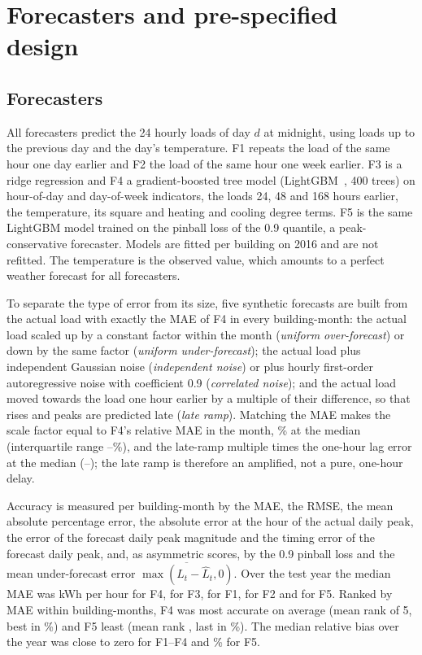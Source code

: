 \section{Forecasters and pre-specified design}\label{sec:design}

\subsection{Forecasters}
All forecasters predict the 24 hourly loads of day $d$ at midnight, using loads up to the previous day and the day's temperature. F1 repeats the load of the same hour one day earlier and F2 the load of the same hour one week earlier. F3 is a ridge regression and F4 a gradient-boosted tree model (LightGBM~\cite{ke2017lightgbm}, 400 trees) on hour-of-day and day-of-week indicators, the loads 24, 48 and 168 hours earlier, the temperature, its square and heating and cooling degree terms. F5 is the same LightGBM model trained on the pinball loss of the 0.9 quantile, a peak-conservative forecaster. Models are fitted per building on 2016 and are not refitted. The temperature is the observed value, which amounts to a perfect weather forecast for all forecasters.

To separate the type of error from its size, five synthetic forecasts are built from the actual load with exactly the MAE of F4 in every building-month: the actual load scaled up by a constant factor within the month (\emph{uniform over-forecast}) or down by the same factor (\emph{uniform under-forecast}); the actual load plus independent Gaussian noise (\emph{independent noise}) or plus hourly first-order autoregressive noise with coefficient 0.9 (\emph{correlated noise}); and the actual load moved towards the load one hour earlier by a multiple of their difference, so that rises and peaks are predicted late (\emph{late ramp}). Matching the MAE makes the scale factor equal to F4's relative MAE in the month, \% at the median (interquartile range --\%), and the late-ramp multiple  times the one-hour lag error at the median (--); the late ramp is therefore an amplified, not a pure, one-hour delay.

Accuracy is measured per building-month by the MAE, the RMSE, the mean absolute percentage error, the absolute error at the hour of the actual daily peak, the error of the forecast daily peak magnitude and the timing error of the forecast daily peak, and, as asymmetric scores, by the 0.9 pinball loss and the mean under-forecast error $\overline{\max(L_t-\hat L_t,0)}$. Over the test year the median MAE was  kWh per hour for F4,  for F3,  for F1,  for F2 and  for F5. Ranked by MAE within building-months, F4 was most accurate on average (mean rank  of 5, best in \%) and F5 least (mean rank , last in \%). The median relative bias over the year was close to zero for F1--F4 and \% for F5.

